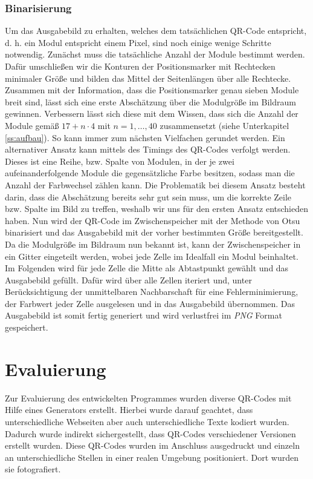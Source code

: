 \documentclass[a4paper, oneside, 12pt]{article}
\begin{document}
\subsubsection{Binarisierung}

Um das Ausgabebild zu erhalten, welches dem tatsächlichen QR-Code entspricht, d. h. ein Modul entspricht einem Pixel, sind noch einige wenige Schritte notwendig.
Zunächst muss die tatsächliche Anzahl der Module bestimmt werden.
Dafür umschließen wir die Konturen der Positionsmarker mit Rechtecken minimaler Größe und bilden das Mittel der Seitenlängen über alle Rechtecke.
Zusammen mit der Information, dass die Positionsmarker genau sieben Module breit sind, lässt sich eine erste Abschätzung über die Modulgröße im Bildraum gewinnen.
Verbessern lässt sich diese mit dem Wissen, dass sich die Anzahl der Module gemäß $17 + n \cdot 4$ mit $n = 1, \dots, 40$ zusammensetzt (siehe Unterkapitel \ref{ss:aufbau}). So kann immer zum nächsten Vielfachen gerundet werden.
Ein alternativer Ansatz kann mittels des Timings des QR-Codes verfolgt werden.
Dieses ist eine Reihe, bzw. Spalte von Modulen, in der je zwei aufeinanderfolgende Module die gegensätzliche Farbe besitzen, sodass man die Anzahl der Farbwechsel zählen kann. Die Problematik bei diesem Ansatz besteht darin, dass die Abschätzung bereits sehr gut sein muss, um die korrekte Zeile bzw. Spalte im Bild zu treffen, weshalb wir uns für den ersten Ansatz entschieden haben.
Nun wird der QR-Code im Zwischenspeicher mit der Methode von Otsu binarisiert und das Ausgabebild mit der vorher bestimmten Größe bereitgestellt.
Da die Modulgröße im Bildraum nun bekannt ist, kann der Zwischenspeicher in ein Gitter eingeteilt werden, wobei jede Zelle im Idealfall ein Modul beinhaltet.
Im Folgenden wird für jede Zelle die Mitte als Abtastpunkt gewählt und das Ausgabebild gefüllt. Dafür wird über alle Zellen iteriert und, unter Berücksichtigung der unmittelbaren Nachbarschaft für eine Fehlerminimierung, der Farbwert jeder Zelle ausgelesen und in das Ausgabebild übernommen.
Das Ausgabebild ist somit fertig generiert und wird verlustfrei im \emph{PNG} Format gespeichert.

\newpage
\section{Evaluierung}
\label{s:evaluierung}

Zur Evaluierung des entwickelten Programmes wurden diverse QR-Codes mit Hilfe eines Generators erstellt. Hierbei wurde darauf geachtet, dass unterschiedliche Webseiten aber auch unterschiedliche Texte kodiert wurden. Dadurch wurde indirekt sichergestellt, dass QR-Codes verschiedener Versionen erstellt wurden. Diese QR-Codes wurden im Anschluss ausgedruckt und einzeln an unterschiedliche Stellen in einer realen Umgebung positioniert. Dort wurden sie fotografiert. 
\end{document}
